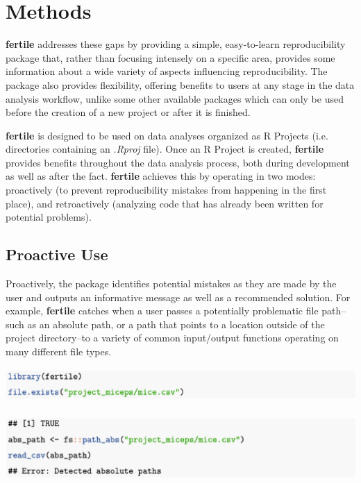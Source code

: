 \documentclass[APA,LATO1COL]{WileyNJD-v2}
\begin{document}
\section{Methods}\label{sec3}

\textbf{fertile} addresses these gaps by providing a simple, easy-to-learn reproducibility package that, rather than focusing intensely on a specific area, provides some information about a wide variety of aspects influencing reproducibility. The package also provides flexibility, offering benefits to users at any stage in the data analysis workflow, unlike some other available packages which can only be used before the creation of a new project or after it is finished.

\textbf{fertile} is designed to be used on data analyses organized as R Projects (i.e. directories containing an \textit{.Rproj} file). Once an R Project is created, \textbf{fertile} provides benefits throughout the data analysis process, both during development as well as after the fact. \textbf{fertile} achieves this by operating in two modes: proactively (to prevent reproducibility mistakes from happening in the first place), and retroactively (analyzing code that has already been written for potential problems).

\subsection{Proactive Use}

Proactively, the package identifies potential mistakes as they are made by the user and outputs an informative message as well as a recommended solution. For example, \textbf{fertile} catches when a user passes a potentially problematic file path--such as an absolute path, or a path that points to a location outside of the project directory--to a variety of common input/output functions operating on many different file types.

\vskip 0.25in

\centerline{\includegraphics[height=3pc,width=180mm]{fig-1}}
\centerline{\includegraphics[height=6pc,width=180mm]{fig-2}}
\end{document}
